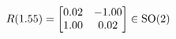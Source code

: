 \documentclass[preview]{standalone}
\begin{document}
\begin{align*}
\special{dvisvgm:raw <g id='unique000'>}R(1.55) = \begin{bmatrix} 0.02 & -1.00 \\ 1.00 & 0.02 \end{bmatrix} \in \text{SO}(2)\special{dvisvgm:raw </g>}
\end{align*}
\end{document}
